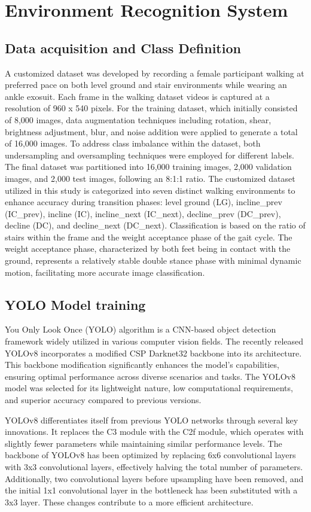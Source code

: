 \documentclass[journal,article,submit,pdftex,moreauthors]{Definitions/mdpi}
\begin{document}
\section{Environment Recognition System}
\subsection{Data acquisition and Class Definition}
A customized dataset was developed by recording a female participant walking at preferred pace on both level ground and stair environments while wearing an ankle exosuit. Each frame in the walking dataset videos is captured at a resolution of 960 x 540 pixels.
For the training dataset, which initially consisted of 8,000 images, data augmentation techniques including rotation, shear, brightness adjustment, blur, and noise addition were applied to generate a total of 16,000 images. To address class imbalance within the dataset, both undersampling and oversampling techniques were employed for different labels. The final dataset was partitioned into 16,000 training images, 2,000 validation images, and 2,000 test images, following an 8:1:1 ratio.
The customized dataset utilized in this study is categorized into seven distinct walking environments to enhance accuracy during transition phases: level ground (LG), incline_prev (IC_prev), incline (IC), incline_next (IC_next), decline_prev (DC_prev), decline (DC), and decline_next (DC_next).
Classification is based on the ratio of stairs within the frame and the weight acceptance phase of the gait cycle. The weight acceptance phase, characterized by both feet being in contact with the ground, represents a relatively stable double stance phase with minimal dynamic motion, facilitating more accurate image classification.
\subsection{YOLO Model training}
You Only Look Once (YOLO) algorithm is a CNN-based object detection framework widely utilized in various computer vision fields. The recently released YOLOv8 incorporates a modified CSP Darknet32 backbone into its architecture. This backbone modification significantly enhances the model's capabilities, ensuring optimal performance across diverse scenarios and tasks. The YOLOv8 model was selected for its lightweight nature, low computational requirements, and superior accuracy compared to previous versions.

YOLOv8 differentiates itself from previous YOLO networks through several key innovations. It replaces the C3 module with the C2f module, which operates with slightly fewer parameters while maintaining similar performance levels. The backbone of YOLOv8 has been optimized by replacing 6x6 convolutional layers with 3x3 convolutional layers, effectively halving the total number of parameters. Additionally, two convolutional layers before upsampling have been removed, and the initial 1x1 convolutional layer in the bottleneck has been substituted with a 3x3 layer. These changes contribute to a more efficient architecture.
\end{document}
